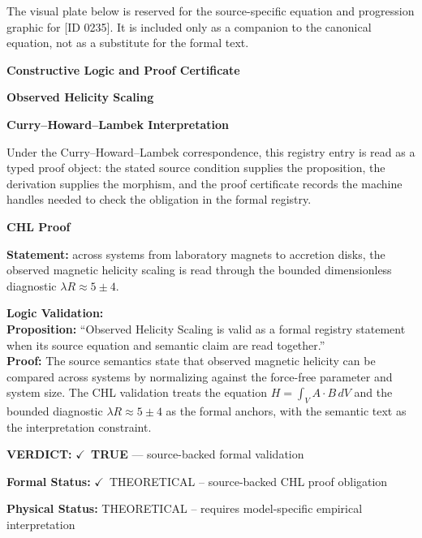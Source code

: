 \begingroup\footnotesize\sloppy
The visual plate below is reserved for the source-specific equation and progression graphic for [ID 0235]. It is included only as a companion to the canonical equation, not as a substitute for the formal text.
\par\endgroup
\ifTZPDarkEdition
{}
\fi

\clearpage
\begingroup\tzpsupportsetup
\noindent\textbf{\fontsize{10.8pt}{12.8pt}\selectfont [ID 0235] Constructive Logic and Proof Certificate}\par
\noindent\textbf{\fontsize{10pt}{12pt}\selectfont Observed Helicity Scaling}\par
\vspace{0.45em}
\begingroup
\footnotesize
\setlength{\parskip}{0.22em}
\setlength{\parindent}{0pt}
\noindent\textbf{Curry--Howard--Lambek Interpretation}\par
Under the Curry--Howard--Lambek correspondence, this registry entry is read as a typed proof
object: the stated source condition supplies the proposition, the derivation supplies the
morphism, and the proof certificate records the machine handles needed to check the obligation
in the formal registry.

\vspace{0.45em}
\noindent\textbf{CHL Proof}\par
\textbf{Statement:} across systems from laboratory magnets to accretion disks, the observed magnetic
helicity scaling is read through the bounded dimensionless diagnostic \(\lambda R\approx5\pm4\).

\textbf{Logic Validation:}\\
\textbf{Proposition:} ``Observed Helicity Scaling is valid as a formal registry statement when its source
equation and semantic claim are read together.''\\
\textbf{Proof:} The source semantics state that observed magnetic helicity can be compared across
systems by normalizing against the force-free parameter and system size. The CHL validation treats
the equation \(H=\int_V A\cdot B\,dV\) and the bounded diagnostic \(\lambda R\approx5\pm4\)
as the formal anchors, with the semantic text as the interpretation constraint.

\textbf{VERDICT:} \ensuremath{\checkmark}\ \textbf{TRUE} --- source-backed formal validation

\textbf{Formal Status:} \ensuremath{\checkmark}\ THEORETICAL -- source-backed CHL proof obligation

\textbf{Physical Status:} THEORETICAL -- requires model-specific empirical interpretation
\par\vspace{0.45em}
\par
\ifTZPDarkEdition
{}
\fi
\endgroup
\endgroup
